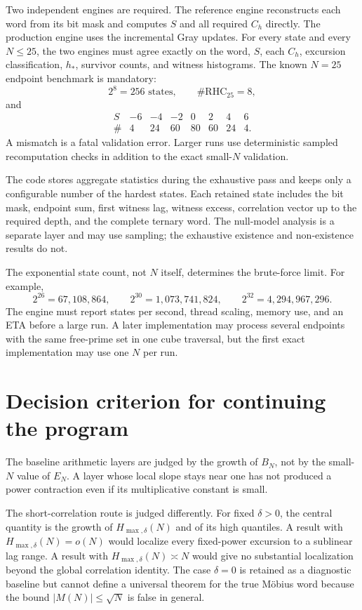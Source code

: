 \documentclass[11pt]{article}
\newcommand{\RHC}{\mathrm{RHC}}
\begin{document}
Two independent engines are required. The reference engine reconstructs each word from its bit mask and computes $S$ and all required $C_h$ directly. The production engine uses the incremental Gray updates. For every state and every $N\le25$, the two engines must agree exactly on the word, $S$, each $C_h$, excursion classification, $h_*$, survivor counts, and witness histograms. The known $N=25$ endpoint benchmark is mandatory:
\[
 2^8=256\text{ states},\qquad \#\RHC_{25}=8,
\]
and
\[
\begin{array}{c|rrrrrrr}
S&-6&-4&-2&0&2&4&6\\ \hline
\#&4&24&60&80&60&24&4.
\end{array}
\]
A mismatch is a fatal validation error. Larger runs use deterministic sampled recomputation checks in addition to the exact small-$N$ validation.

The code stores aggregate statistics during the exhaustive pass and keeps only a configurable number of the hardest states. Each retained state includes the bit mask, endpoint sum, first witness lag, witness excess, correlation vector up to the required depth, and the complete ternary word. The null-model analysis is a separate layer and may use sampling; the exhaustive existence and non-existence results do not.

The exponential state count, not $N$ itself, determines the brute-force limit. For example,
\[
 2^{26}=67{,}108{,}864,
 \qquad
 2^{30}=1{,}073{,}741{,}824,
 \qquad
 2^{32}=4{,}294{,}967{,}296.
\]
The engine must report states per second, thread scaling, memory use, and an ETA before a large run. A later implementation may process several endpoints with the same free-prime set in one cube traversal, but the first exact implementation may use one $N$ per run.

\section{Decision criterion for continuing the program}
The baseline arithmetic layers are judged by the growth of $B_N$, not by the small-$N$ value of $E_N$. A layer whose local slope stays near one has not produced a power contraction even if its multiplicative constant is small.

The short-correlation route is judged differently. For fixed $\delta>0$, the central quantity is the growth of $H_{\max,\delta}(N)$ and of its high quantiles. A result with $H_{\max,\delta}(N)=o(N)$ would localize every fixed-power excursion to a sublinear lag range. A result with $H_{\max,\delta}(N)\asymp N$ would give no substantial localization beyond the global correlation identity. The case $\delta=0$ is retained as a diagnostic baseline but cannot define a universal theorem for the true Möbius word because the bound $|M(N)|\le\sqrt N$ is false in general.
\end{document}
